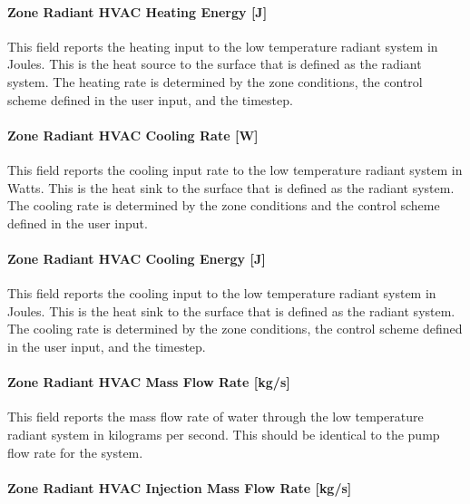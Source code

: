 \paragraph{Zone Radiant HVAC Heating Energy {[}J{]}}\label{zone-radiant-hvac-heating-energy-j-1}

This field reports the heating input to the low temperature radiant system in Joules. This is the heat source to the surface that is defined as the radiant system. The heating rate is determined by the zone conditions, the control scheme defined in the user input, and the timestep.

\paragraph{Zone Radiant HVAC Cooling Rate {[}W{]}}\label{zone-radiant-hvac-cooling-rate-w-1}

This field reports the cooling input rate to the low temperature radiant system in Watts. This is the heat sink to the surface that is defined as the radiant system. The cooling rate is determined by the zone conditions and the control scheme defined in the user input.

\paragraph{Zone Radiant HVAC Cooling Energy {[}J{]}}\label{zone-radiant-hvac-cooling-energy-j-1}

This field reports the cooling input to the low temperature radiant system in Joules. This is the heat sink to the surface that is defined as the radiant system. The cooling rate is determined by the zone conditions, the control scheme defined in the user input, and the timestep.

\paragraph{Zone Radiant HVAC Mass Flow Rate {[}kg/s{]}}\label{zone-radiant-hvac-mass-flow-rate-kgs}

This field reports the mass flow rate of water through the low temperature radiant system in kilograms per second. This should be identical to the pump flow rate for the system.

\paragraph{Zone Radiant HVAC Injection Mass Flow Rate {[}kg/s{]}}\label{zone-radiant-hvac-injection-mass-flow-rate-kgs}

